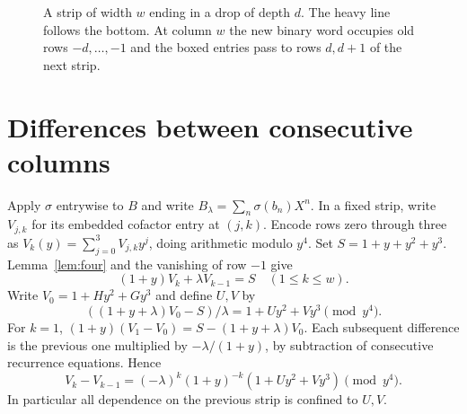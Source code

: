 \documentclass[11pt,reqno]{amsart}
\numberwithin{equation}{section}
\begin{document}
\begin{figure}[ht]
\centering
{}
\caption{A strip of width $w$ ending in a drop of depth $d$. The heavy line follows the bottom. At column $w$ the new binary word occupies old rows $-d,\ldots,-1$ and the boxed entries pass to rows $d,d+1$ of the next strip.}\label{fig:shared-column}
\end{figure}

\section{Differences between consecutive columns}\label{sec:diff}
Apply $\sigma$ entrywise to $B$ and write $B_\lambda=\sum_n\sigma(b_n)X^n$. In a fixed strip, write $V_{j,k}$ for its embedded cofactor entry at $(j,k)$. Encode rows zero through three as $V_k(y)=\sum_{j=0}^3 V_{j,k}y^j$, doing arithmetic modulo $y^4$. Set $S=1+y+y^2+y^3$. Lemma~\ref{lem:four} and the vanishing of row $-1$ give
\[
 (1+y)V_k+\lambda V_{k-1}=S \quad(1\le k\le w).
\]
Write $V_0=1+Hy^2+Gy^3$ and define $U,V$ by
\[
 ((1+y+\lambda)V_0-S)/\lambda=1+Uy^2+Vy^3\pmod{y^4}.
\]
For $k=1$, $(1+y)(V_1-V_0)=S-(1+y+\lambda)V_0$. Each subsequent difference is the previous one multiplied by $-\lambda/(1+y)$, by subtraction of consecutive recurrence equations. Hence
\begin{equation}\label{eq:diff}
 V_k-V_{k-1}=(-\lambda)^k(1+y)^{-k}(1+Uy^2+Vy^3)\pmod{y^4}.
\end{equation}
In particular all dependence on the previous strip is confined to $U,V$.
\end{document}
